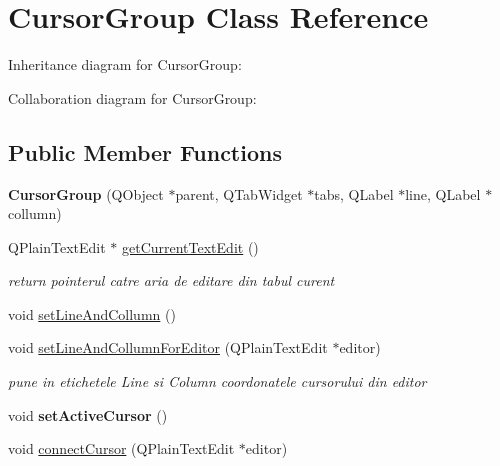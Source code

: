 \hypertarget{class_cursor_group}{}\section{Cursor\+Group Class Reference}
\label{class_cursor_group}


Inheritance diagram for Cursor\+Group\+:


Collaboration diagram for Cursor\+Group\+:
\subsection*{Public Member Functions}
\begin{DoxyCompactItemize}
\item 
\mbox{\label{class_cursor_group_af7296db01d171b287fdbdb5c5cd4ee7b}} 
{\bfseries Cursor\+Group} (Q\+Object $\ast$parent, Q\+Tab\+Widget $\ast$tabs, Q\+Label $\ast$line, Q\+Label $\ast$collumn)
\item 
\mbox{\label{class_cursor_group_a0832838add9449014661ef9b3f9a984e}} 
Q\+Plain\+Text\+Edit $\ast$ \hyperlink{class_cursor_group_a0832838add9449014661ef9b3f9a984e}{get\+Current\+Text\+Edit} ()
\begin{DoxyCompactList}\small\item\em return pointerul catre aria de editare din tabul curent \end{DoxyCompactList}\item 
void \hyperlink{class_cursor_group_af216081a863ff279d67227c355f112e1}{set\+Line\+And\+Collumn} ()
\item 
\mbox{\label{class_cursor_group_a7adf8b3f19bae07eb6c281be477fbcdf}} 
void \hyperlink{class_cursor_group_a7adf8b3f19bae07eb6c281be477fbcdf}{set\+Line\+And\+Collumn\+For\+Editor} (Q\+Plain\+Text\+Edit $\ast$editor)
\begin{DoxyCompactList}\small\item\em pune in etichetele Line si Column coordonatele cursorului din editor \end{DoxyCompactList}\item 
\mbox{\label{class_cursor_group_a27b5f50f419268c2742465ec3de3a30b}} 
void {\bfseries set\+Active\+Cursor} ()
\item 
void \hyperlink{class_cursor_group_a443ff52a9e41c5b3c5cf15e0087db1d6}{connect\+Cursor} (Q\+Plain\+Text\+Edit $\ast$editor)
\end{DoxyCompactItemize}


